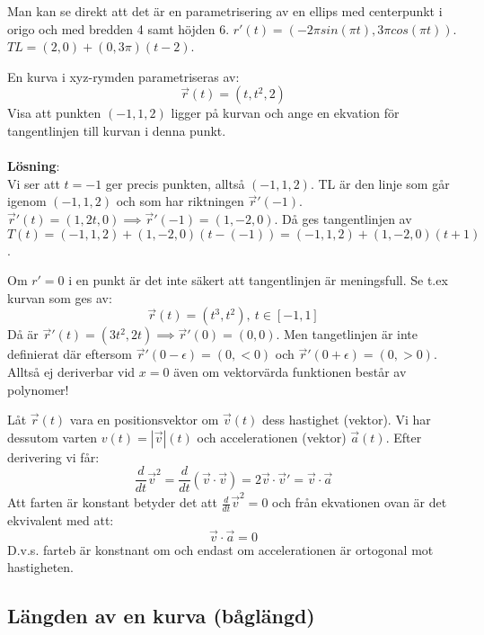 \documentclass{report}
\begin{document}
\sol Man kan se direkt att det är en parametrisering av en ellips med centerpunkt i origo och med bredden 4 samt höjden 6. $ r'(t) = (-2\pi sin(\pi t), 3\pi cos(\pi t)) $. $TL = (2,0) + (0, 3\pi)(t-2)$.   

\pagebreak
\ex{}
{
En kurva i xyz-rymden parametriseras av:
\begin{equation*}
\vec{r} (t) = (t,t^2,2)
\end{equation*}
Visa att punkten $ (-1,1,2) $ ligger på kurvan och ange en ekvation för tangentlinjen till kurvan i denna punkt.\\\\

\textbf{Lösning}:\\
Vi ser att $ t = -1 $ ger precis punkten, alltså $ (-1,1,2) $. TL är den linje som går igenom $ (-1,1,2) $ och som har riktningen $ \vec{r}'(-1) $. $ \vec{r} '(t) = (1, 2t, 0) \implies \vec{r}'(-1) = (1, -2, 0)$. Då ges tangentlinjen av $ T(t) = (-1,1,2) + (1,-2,0)(t-(-1)) = (-1,1,2) + (1,-2,0)(t+1) $. 
}

Om $ r' = 0 $ i en punkt är det inte säkert att tangentlinjen är meningsfull. Se t.ex kurvan som ges av:
\begin{equation*}
	\vec{r}(t) = (t^3, t^2), \: t \in [-1,1]
\end{equation*}
Då är $ \vec{r} '(t) = (3t^2, 2t) \implies \vec{r} '(0) = (0,0)$. Men tangetlinjen är inte definierat där eftersom $ \vec{r} '(0 - \epsilon) = (0, <0) $ och $ \vec{r} '(0 + \epsilon) = (0, > 0) $. Alltså ej deriverbar vid $ x = 0 $ även om vektorvärda funktionen består av polynomer!  

\ex{}
{
Låt $ \vec{r} (t) $ vara en positionsvektor om $ \vec{v}  (t) $ dess hastighet (vektor). Vi har dessutom varten $ v(t) = | \vec{v} |(t) $ och accelerationen (vektor) $ \vec{a} (t) $. Efter derivering vi får:
\begin{equation*}
\frac{d}{dt} \vec{v}  ^2 = \frac{d}{dt}( \vec{v}  \cdot \vec{v} ) = 2 \vec{v}  \cdot \vec{v} ' = \vec{v} \cdot \vec{a} 
\end{equation*}
Att farten är konstant betyder det att $ \frac{d}{dt} \vec{v}^2 = 0 $ och från ekvationen ovan är det ekvivalent med att:
\begin{equation*}
\vec{v} \cdot \vec{a} = 0
\end{equation*}
D.v.s. farteb är konstnant om och endast om accelerationen är ortogonal mot hastigheten.
}

\subsection{Längden av en kurva (båglängd)}
\end{document}

